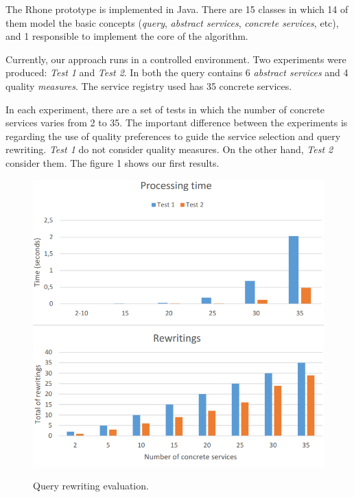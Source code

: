 


The Rhone prototype is implemented in Java.
There are 15 classes in which 14 of them model the basic concepts 
(\textit{query}, \textit{abstract services}, \textit{concrete services}, etc), 
and 1 responsible to implement the core of the algorithm.

Currently, our approach runs in a controlled environment. 
Two experiments were produced: \textit{Test 1} and \textit{Test 2}. 
In both the query contains 6 \textit{abstract services} and 4 quality \textit{measures}.
The service registry used has 35 concrete services.

In each experiment, there are a set of tests in which the number of concrete 
services varies from 2 to 35.
The important difference between the experiments is regarding the use of quality preferences
to guide the service selection and query rewriting.
\textit{Test 1} do not consider quality measures. 
On the other hand, \textit{Test 2} consider them.
The figure 1 shows our first results.
  
\begin{figure}[!h]
\centering
\includegraphics[scale=0.32]{analysis.png}
\label{fig:fig01}
\caption{Query rewriting evaluation.}
\end{figure} 
 
